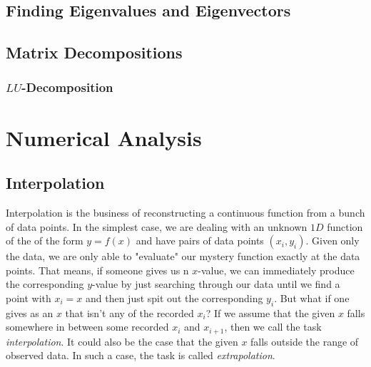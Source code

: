 \subsection{Finding Eigenvalues and Eigenvectors}


\subsection{Matrix Decompositions}

\subsubsection{$LU$-Decomposition}





\section{Numerical Analysis}


\subsection{Interpolation}
Interpolation is the business of reconstructing a continuous function from a bunch of data points. In the simplest case, we are dealing with an unknown $1D$ function of the of the form $y = f(x)$ and have pairs of data points $(x_i, y_i)$. Given only the data, we are only able to "evaluate" our mystery function exactly at the data points. That means, if someone gives us n $x$-value, we can immediately produce the corresponding $y$-value by just searching through our data until we find a point with $x_i = x$ and then just spit out the corresponding $y_i$. But what if one gives as an $x$ that isn't any of the recorded $x_i$? If we assume that the given $x$ falls somewhere in between some recorded $x_i$ and $x_{i+1}$, then we call the task \emph{interpolation}. It could also be the case that the given $x$ falls outside the range of observed data. In such a case, the task is called \emph{extrapolation}.

